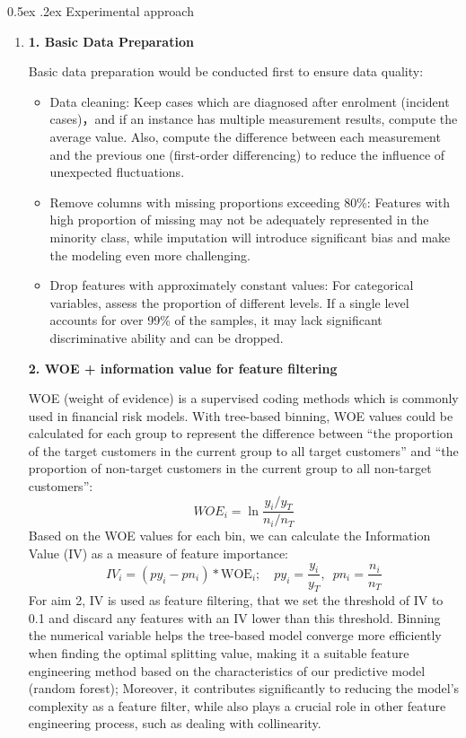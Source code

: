 \documentclass[12pt,]{article}
\makeatletter
\providecommand{\tightlist}{%
  \setlength{\itemsep}{0pt}\setlength{\parskip}{0pt}}
\renewcommand\subsection{
  \@startsection{subsection}{2}{\z@}
    {-1.5ex\@plus -1ex \@minus -.2ex}%
    {0.5ex \@plus .2ex}%
    {\normalfont\normalsize\bf}} %
\makeatother
\begin{document}
\hypertarget{experimental-approach}{%
\subsection{Experimental approach}\label{experimental-approach}}

\begin{enumerate}
\def\labelenumi{\arabic{enumi}.}
\item
  \textbf{1. Basic Data Preparation}

  Basic data preparation would be conducted first to ensure data
  quality:

  \begin{itemize}
  \tightlist
  \item
    Data cleaning: Keep cases which are diagnosed after enrolment
    (incident cases)，and if an instance has multiple measurement
    results, compute the average value. Also, compute the difference
    between each measurement and the previous one (first-order
    differencing) to reduce the influence of unexpected fluctuations.
  \item
    Remove columns with missing proportions exceeding 80\%: Features
    with high proportion of missing may not be adequately represented in
    the minority class, while imputation will introduce significant bias
    and make the modeling even more challenging.
  \item
    Drop features with approximately constant values: For categorical
    variables, assess the proportion of different levels. If a single
    level accounts for over 99\% of the samples, it may lack significant
    discriminative ability and can be dropped.
  \end{itemize}

  \textbf{2. WOE + information value for feature filtering}

  WOE (weight of evidence) is a supervised coding methods which is
  commonly used in financial risk models. With tree-based binning, WOE
  values could be calculated for each group to represent the difference
  between ``the proportion of the target customers in the current group
  to all target customers'' and ``the proportion of non-target customers
  in the current group to all non-target customers'': \[
  WOE_{i} = \ln{\frac{y_i/y_T}{n_i/n_T}}
  \] Based on the WOE values for each bin, we can calculate the
  Information Value (IV) as a measure of feature importance: \[
  IV_i = ( py_i - pn_i )*\text{WOE}_i; \quad py_i=\frac{y_i}{y_T},\,\,\,pn_i=\frac{n_i}{n_T}
  \] For aim 2, IV is used as feature filtering, that we set the
  threshold of IV to 0.1 and discard any features with an IV lower than
  this threshold. Binning the numerical variable helps the tree-based
  model converge more efficiently when finding the optimal splitting
  value, making it a suitable feature engineering method based on the
  characteristics of our predictive model (random forest); Moreover, it
  contributes significantly to reducing the model's complexity as a
  feature filter, while also plays a crucial role in other feature
  engineering process, such as dealing with collinearity.


\end{enumerate}
\end{document}
